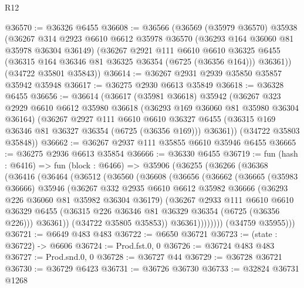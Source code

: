 \begin{lexlean}{R12}
\begin{coremodule}
@36570 := @36326 @6455
@36608 := @36566
    (@36569
      (@35979 @36570)
      @35938
      (@36267
        @314
        @2923
        @6610
        @6612
        @35978
        @36570
        (@36293 @164 @36060 @81 @35978 @36304 @36149)
        (@36267
          @2921
          @111
          @6610
          @6610
          @36325
          @6455
          (@36315 @164 @36346 @81 @36325 @36354 (@6725 (@36356 @164)))
          @36361))
      (@34722 @35801 @35843))
@36614 := @36267 @2931 @2939 @35850 @35857 @35942 @35948
@36617 := @36275 @2930 @6613 @35849
@36618 := @36328 @6455
@36656 := @36614
    (@36617
      (@35981 @36618)
      @35942
      (@36267
        @323
        @2929
        @6610
        @6612
        @35980
        @36618
        (@36293 @169 @36060 @81 @35980 @36304 @36164)
        (@36267
          @2927
          @111
          @6610
          @6610
          @36327
          @6455
          (@36315 @169 @36346 @81 @36327 @36354 (@6725 (@36356 @169)))
          @36361))
      (@34722 @35803 @35848))
@36662 := @36267 @2937 @111 @35855 @6610 @35946 @6455
@36665 := @36275 @2936 @6613 @35854
@36666 := @36330 @6455
@36719 := fun (hash : @6416) =>
  fun (block : @6466) =>
  @35906
    (@36255
      (@36266
        (@36368
          (@36416
            (@36464
              (@36512
                (@36560
                  (@36608
                    (@36656
                      (@36662
                        (@36665
                          (@35983 @36666)
                          @35946
                          (@36267
                            @332
                            @2935
                            @6610
                            @6612
                            @35982
                            @36666
                            (@36293 @226 @36060 @81 @35982 @36304 @36179)
                            (@36267
                              @2933
                              @111
                              @6610
                              @6610
                              @36329
                              @6455
                              (@36315 @226 @36346 @81 @36329 @36354 (@6725 (@36356 @226)))
                              @36361))
                          (@34722 @35805 @35853))
                        @36361))))))))
        (@34759 @35955)))
@36721 := @6649 @483 @483
@36722 := @6650 @36721
@36723 := (state : @36722) -> @6606
@36724 := Prod.fst.{0, 0}
@36726 := @36724 @483 @483
@36727 := Prod.snd.{0, 0}
@36728 := @36727 @44
@36729 := @36728 @36721
@36730 := @36729 @6423
@36731 := @36726 @36730
@36733 := @32824 @36731 @1268

\end{coremodule}
\end{lexlean}
